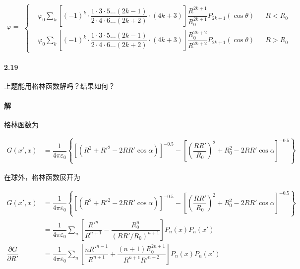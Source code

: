 \documentclass{article}
\begin{document}
\begin{equation*}
  \begin{aligned}
    \varphi = 
  \end{aligned}
  \left\{
  \begin{aligned}
    &\varphi_0 \sum_k \left[ \left( -1  \right)^k \cdot \dfrac{1 \cdot 3 \cdot 5 \dots \left( 2k-1 \right)}{2 \cdot 4 \cdot 6 \dots \left( 2k+2 \right)} \cdot \left( 4k+3 \right)
 \right] \dfrac{R^{2k+1}}{R_0^{2k+1}}  P_{2k+1} \left( \cos \theta \right) && R<R_0\\
    &\varphi_0 \sum_k \left[ \left( -1  \right)^k \cdot \dfrac{1 \cdot 3 \cdot 5 \dots \left( 2k-1 \right)}{2 \cdot 4 \cdot 6 \dots \left( 2k+2 \right)} \cdot \left( 4k+3 \right)
 \right] \dfrac{R_0^{2k+2}}{R^{2k+2}}  P_{2k+1} \left( \cos \theta \right) && R>R_0
  \end{aligned}
  \right.
\end{equation*}

\paragraph{2.19}

上题能用格林函数解吗？结果如何？

\paragraph{解}

格林函数为

\begin{equation*}
  \begin{aligned}
    G \left( x', x \right) &= 
      \dfrac{1}{4\pi \varepsilon_0} \left\{ \left[ \left( R^2 + R'^2 - 2 R R' \cos \alpha \right) \right]^{-0.5} -
      \left[ \left( \dfrac{R R'}{R_0}  \right)^2 + R_0^2 - 2 RR' \cos \alpha \right]^{-0.5}
    \right\}
  \end{aligned}
\end{equation*}

在球外，格林函数展开为

\begin{equation*}
  \begin{aligned}
    G \left( x', x \right) &= 
      \dfrac{1}{4\pi \varepsilon_0} \left\{ \left[ \left( R^2 + R'^2 - 2 R R' \cos \alpha \right) \right]^{-0.5} -
      \left[ \left( \dfrac{R R'}{R_0}  \right)^2 + R_0^2 - 2 RR' \cos \alpha \right]^{-0.5}
    \right\} \\
    &= \dfrac{1}{4\pi \varepsilon_0} \sum_n \left[ \dfrac{R'^n}{R^{n+1}} - \dfrac{R_0^n}{\left( RR'/R_0 \right)^{n+1}}   \right] P_n \left( x \right) P_n \left( x' \right) \\
    \dfrac{\partial G}{\partial R'} &=
    \dfrac{1}{4\pi \varepsilon_0} \sum_n \left[ \dfrac{n R'^{n-1}}{R^{n+1}}  + \dfrac{\left( n+1 \right) R_0^{2n+1}}{R^{n+1} R'^{n+2}}  \right] P_n \left( x \right) P_n \left( x' \right)
  \end{aligned}
\end{equation*}
\end{document}
